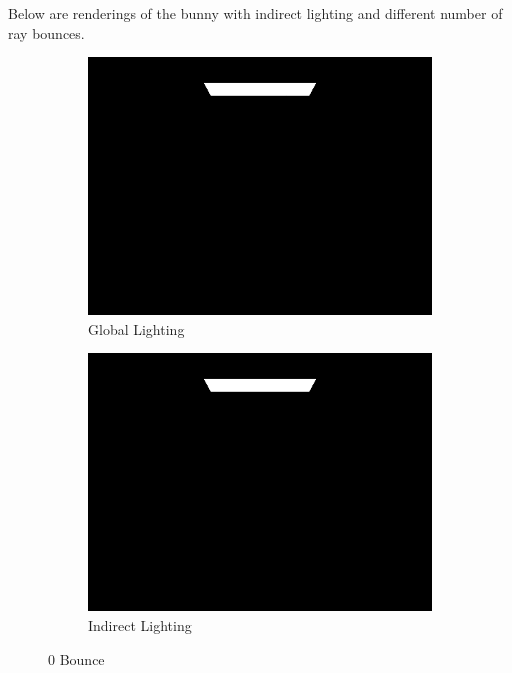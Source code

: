 \documentclass{article}
\begin{document}
Below are renderings of the bunny with indirect lighting and different number of ray bounces. 
\begin{figure}[htb!]
\begin{subfigure}[h]{0.4\textwidth}
\includegraphics[width=\textwidth]{task4/CBbunny_global_1024_0.png}
\caption{Global Lighting}
\end{subfigure}
\hfill\vrule\hfill
\begin{subfigure}[h]{0.4\textwidth}
\includegraphics[width=\textwidth]{task4/CBbunny_indirect_1024_0.png}
\caption{Indirect Lighting}
\end{subfigure}%

\caption[f2]{0 Bounce}
\end{figure}
\end{document}

